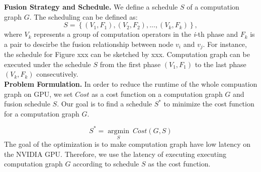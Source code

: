 

\textbf{Fusion Strategy and Schedule.} 
We define a schedule $S$ of a computation graph $G$. The scheduling can be defined as:
\begin{equation}
    S = \left\{(V_1, F_1), (V_2, F_2), ..., (V_k, F_k)\right\},
\end{equation}
where $V_k$ represents a group of computation operators in the \textit{i}-th phase and $F_k$ is a pair to descirbe the fusion relationship between node $v_i$
and $v_j$. For instance, the schedule for Figure xxx can be sketched by xxx.
Computation graph can be executed under the schedule $S$ from the first phase $(V_1, F_1)$ to the last phase $(V_k, F_k)$ consecutively.\\



\textbf{Problem Formulation.}
In order to reduce the runtime of the whole compuation graph on GPU, we set $Cost$ as a cost function on a computation graph $G$ and 
fusion schedule $S$. Our goal is to find a schedule $S^*$ to minimize the cost function for a computation graph $G$.

\begin{equation}
    {S^*} = \mathop{argmin}\limits_{S} \ Cost(G, S)
\end{equation}
The goal of the optimization is to make computation graph have low latency on the NVIDIA GPU. Therefore, we use the latency of executing executing computation 
graph $G$ according to schedule $S$ as the cost function. \\




\label{sec:form}
